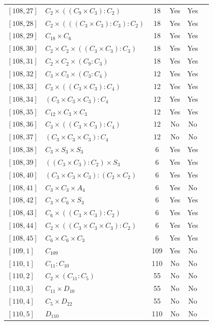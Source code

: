 \documentclass[12pt, a4paper]{article}
\theoremstyle{plain}
\theoremstyle{definition}
\begin{document}
\begin{longtable}{llcccl}
  $[108,27]$ & $C_2 \times ((C_9 \times C_3) : C_2)$ & 18 & Yes & Yes \\
  $[108,28]$ & $C_2 \times (((C_3 \times C_3) : C_3) : C_2)$ & 18 & Yes & Yes \\
  $[108,29]$ & $C_{18} \times C_6$ & 18 & Yes & Yes \\
  $[108,30]$ & $C_2 \times C_2 \times ((C_3 \times C_3) : C_3)$ & 18 & Yes & Yes \\
  $[108,31]$ & $C_2 \times C_2 \times (C_9 : C_3)$ & 18 & Yes & Yes \\
  $[108,32]$ & $C_3 \times C_3 \times (C_3 : C_4)$ & 12 & Yes & Yes \\
  $[108,33]$ & $C_3 \times ((C_3 \times C_3) : C_4)$ & 12 & Yes & Yes \\
  $[108,34]$ & $(C_3 \times C_3 \times C_3) : C_4$ & 12 & Yes & Yes \\
  $[108,35]$ & $C_{12} \times C_3 \times C_3$ & 12 & Yes & Yes \\
  $[108,36]$ & $C_3 \times ((C_3 \times C_3) : C_4)$ & 12 & No & No \\
  $[108,37]$ & $(C_3 \times C_3 \times C_3) : C_4$ & 12 & No & No \\
  $[108,38]$ & $C_3 \times S_3 \times S_3$ & 6 & Yes & Yes \\
  $[108,39]$ & $((C_3 \times C_3) : C_2) \times S_3$ & 6 & Yes & Yes \\
  $[108,40]$ & $(C_3 \times C_3 \times C_3) : (C_2 \times C_2)$ & 6 & Yes & Yes \\
  $[108,41]$ & $C_3 \times C_3 \times A_4$ & 6 & Yes & No \\
  $[108,42]$ & $C_3 \times C_6 \times S_3$ & 6 & Yes & Yes \\
  $[108,43]$ & $C_6 \times ((C_3 \times C_3) : C_2)$ & 6 & Yes & Yes \\
  $[108,44]$ & $C_2 \times ((C_3 \times C_3 \times C_3) : C_2)$ & 6 & Yes & Yes \\
  $[108,45]$ & $C_6 \times C_6 \times C_3$ & 6 & Yes & Yes \\
  $[109,1]$ & $C_{109}$ & 109 & Yes & No \\
  $[110,1]$ & $C_{11} : C_{10}$ & 110 & No & No \\
  $[110,2]$ & $C_2 \times (C_{11} : C_5)$ & 55 & No & No \\
  $[110,3]$ & $C_{11} \times D_{10}$ & 55 & No & No \\
  $[110,4]$ & $C_5 \times D_{22}$ & 55 & No & No \\
  $[110,5]$ & $D_{110}$ & 110 & No & No \\

\end{longtable}
\end{document}
